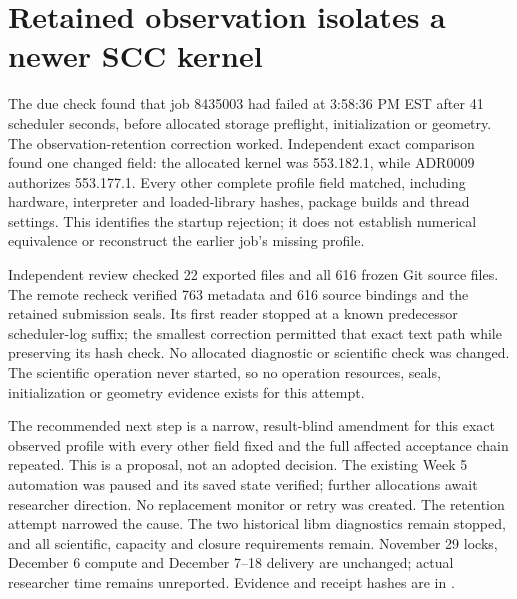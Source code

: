 \section{Retained observation isolates a newer SCC kernel}

The due check found that job 8435003 had failed at 3:58:36 PM EST after
41 scheduler seconds, before allocated storage preflight, initialization or
geometry. The observation-retention correction worked. Independent exact
comparison found one changed field: the allocated kernel was 553.182.1, while
ADR0009 authorizes 553.177.1. Every other complete profile field matched,
including hardware, interpreter and loaded-library hashes, package builds and
thread settings. This identifies the startup rejection; it does not establish
numerical equivalence or reconstruct the earlier job's missing profile.

Independent review checked 22 exported files and all 616 frozen Git source
files. The remote recheck verified 763 metadata and 616 source bindings and the
retained submission seals. Its first reader stopped at a known predecessor
scheduler-log suffix; the smallest correction permitted that exact text path
while preserving its hash check. No allocated diagnostic or scientific check
was changed. The scientific operation never started, so no operation resources,
seals, initialization or geometry evidence exists for this attempt.

The recommended next step is a narrow, result-blind amendment for this exact
observed profile with every other field fixed and the full affected acceptance
chain repeated. This is a proposal, not an adopted decision. The existing
Week 5 automation was paused and its saved state verified; further allocations
await researcher direction. No replacement monitor or retry was created.
The retention attempt narrowed the cause. The two historical libm diagnostics
remain stopped, and all scientific, capacity and closure requirements remain.
November 29 locks, December 6 compute and December 7--18 delivery are unchanged;
actual researcher time remains unreported. Evidence and receipt hashes are in
.
